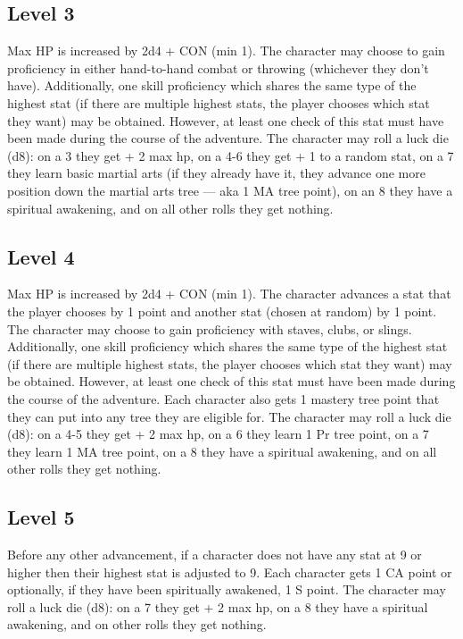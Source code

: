 \documentclass[letterpaper,12pt]{article}
\begin{document}
\subsection{Level 3}

Max HP is increased by 2d4 + CON (min 1). The character may choose to gain proficiency in either hand-to-hand combat or throwing (whichever they don't have). Additionally, one skill proficiency which shares the same type of the highest stat (if there are multiple highest stats, the player chooses which stat they want) may be obtained. However, at least one check of this stat must have been made during the course of the adventure. The character may roll a luck die (d8): on a 3 they get + 2 max hp, on a 4-6 they get + 1 to a random stat, on a 7 they learn basic martial arts (if they already have it, they advance one more position down the martial arts tree --- aka 1 MA tree point), on an 8 they have a spiritual awakening, and on all other rolls they get nothing. 

\subsection{Level 4}

Max HP is increased by 2d4 + CON (min 1). The character advances a stat that the player chooses by 1 point and another stat (chosen at random) by 1 point. The character may choose to gain proficiency with staves, clubs, or slings. Additionally, one skill proficiency which shares the same type of the highest stat (if there are multiple highest stats, the player chooses which stat they want) may be obtained. However, at least one check of this stat must have been made during the course of the adventure. Each character also gets 1 mastery tree point that they can put into any tree they are eligible for. The character may roll a luck die (d8): on a 4-5 they get + 2 max hp, on a 6 they learn 1 Pr tree point, on a 7 they learn 1 MA tree point, on a 8 they have a spiritual awakening, and on all other rolls they get nothing. 

\subsection{Level 5}

Before any other advancement, if a character does not have any stat at 9 or higher then their highest stat is adjusted to 9. Each character gets 1 CA point or optionally, if they have been spiritually awakened, 1 S point. The character may roll a luck die (d8): on a 7 they get + 2 max hp, on a 8 they have a spiritual awakening, and on other rolls they get nothing. 
\end{document}
